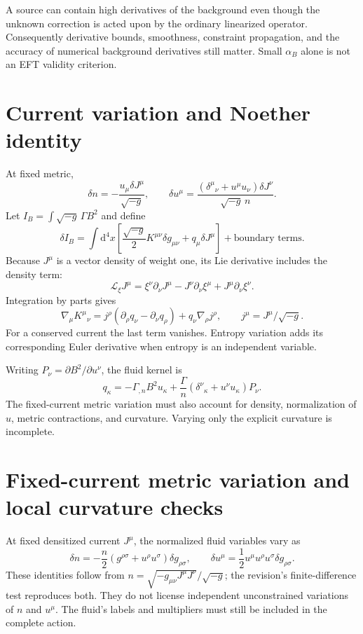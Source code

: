 \documentclass[11pt,oneside]{report}
\newcommand{\dd}{\mathrm d}
\begin{document}
A source can contain high derivatives of the background even though the unknown correction is acted upon by the ordinary linearized operator. Consequently derivative bounds, smoothness, constraint propagation, and the accuracy of numerical background derivatives still matter. Small $\alpha_B$ alone is not an EFT validity criterion.

\section{Current variation and Noether identity}
At fixed metric,
\begin{equation}
\delta n=-\frac{u_\mu\delta J^\mu}{\sqrt{-g}},\qquad
\delta u^\mu=\frac{(\delta^\mu{}_{\nu}+u^\mu u_\nu)\delta J^\nu}{\sqrt{-g}\,n}.
\end{equation}
Let $I_B=\int\sqrt{-g}\,\Gamma B^2$ and define
\begin{equation}
\delta I_B=\int\dd^4x\left[\frac{\sqrt{-g}}2K^{\mu\nu}\delta g_{\mu\nu}+q_\mu\delta J^\mu\right]
+\text{boundary terms}.
\end{equation}
Because $J^\mu$ is a vector density of weight one, its Lie derivative includes the density term:
\begin{equation}
\mathcal L_\xi J^\mu=\xi^\nu\partial_\nu J^\mu-J^\nu\partial_\nu\xi^\mu+J^\mu\partial_\nu\xi^\nu.
\end{equation}
Integration by parts gives
\begin{equation}\label{eq:ward}
\nabla_\mu K^\mu{}_{\nu}
=j^\rho(\partial_\rho q_\nu-\partial_\nu q_\rho)
+q_\nu\nabla_\rho j^\rho,\qquad j^\mu=J^\mu/\sqrt{-g}.
\end{equation}
For a conserved current the last term vanishes. Entropy variation adds its corresponding Euler derivative when entropy is an independent variable.

Writing $P_\nu=\partial B^2/\partial u^\nu$, the fluid kernel is
\begin{equation}
q_\kappa=-\Gamma_{,n}B^2u_\kappa+
\frac{\Gamma}{n}(\delta^\nu{}_{\kappa}+u^\nu u_\kappa)P_\nu.
\end{equation}
The fixed-current metric variation must also account for density, normalization of $u$, metric contractions, and curvature. Varying only the explicit curvature is incomplete.

\section{Fixed-current metric variation and local curvature checks}
At fixed densitized current $J^\mu$, the normalized fluid variables vary as
\begin{equation}
\delta n=-\frac n2(g^{\rho\sigma}+u^\rho u^\sigma)\delta g_{\rho\sigma},
\qquad
\delta u^\mu=\frac12u^\mu u^\rho u^\sigma\delta g_{\rho\sigma}.
\end{equation}
These identities follow from $n=\sqrt{-g_{\mu\nu}J^\mu J^\nu}/\sqrt{-g}$; the revision's finite-difference test reproduces both. They do not license independent unconstrained variations of $n$ and $u^\mu$. The fluid's labels and multipliers must still be included in the complete action.
\end{document}
